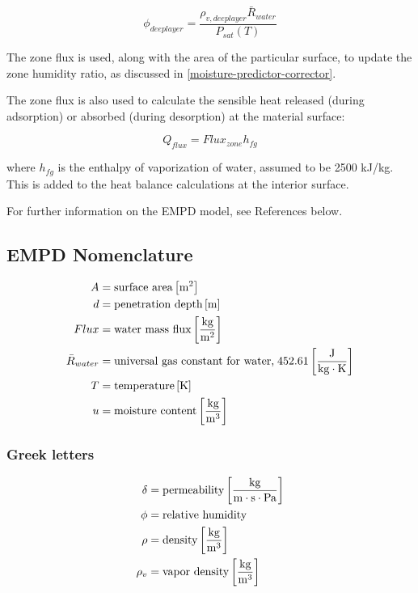 \begin{equation}
\phi_{deeplayer} = \frac {\rho_{v,deeplayer} \bar R_{water}} {P_{sat}(T)}
\end{equation}

The zone flux is used, along with the area of the particular surface, to update the zone humidity ratio, as discussed in \ref{moisture-predictor-corrector}.

The zone flux is also used to calculate the sensible heat released (during adsorption) or absorbed (during desorption) at the material surface:

\begin{equation}
Q_{flux} = Flux_{zone} h_{fg}
\end{equation}

where $h_{fg}$ is the enthalpy of vaporization of water, assumed to be 2500 kJ/kg. This is added to the heat balance calculations at the interior surface.

For further information on the EMPD model, see References below.

\subsection{EMPD Nomenclature}\label{empd-nomenclature}
\begin{align*}  
  A  &= \text{surface area} \bracketunits{m^{2}} \\
  d &= \text{penetration depth} \bracketunits{m} \\
  Flux &= \text{water mass flux} \bracketunits{\frac{kg}{m^{2}}} \\
  \bar R_{water} &= \text{universal gas constant for water,} \; 452.61 \bracketunits{\frac{J}{kg \cdot K}}   \\
  T &= \text{temperature} \bracketunits{K} \\
  u &= \text{moisture content} \bracketunits{\frac{kg}{m^{3}}}
\end{align*}

\subsubsection{Greek letters}\label{greek-letters}
\begin{align*}  
  \delta  &= \text{permeability} \bracketunits{\frac{kg}{m \cdot s \cdot Pa}} \\
  \phi &= \text{relative humidity} \\
  \rho &= \text{density} \bracketunits{\frac{kg}{m^{3}}} \\
  \rho_{v} &= \text{vapor density} \bracketunits{\frac{kg}{m^{3}}} \\
\end{align*}

